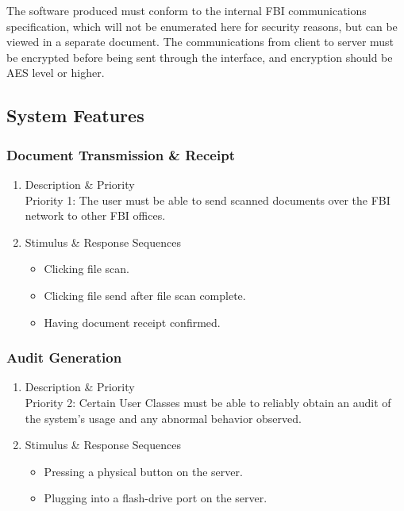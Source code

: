 \documentclass[12pt]{article}
\begin{document}
The software produced must conform to the internal FBI communications specification, which will not be
enumerated here for security reasons, but can be viewed in a separate document. The communications from client
to server must be encrypted before being sent through the interface, and encryption should be AES level or higher.

\subsection{System Features}

\subsubsection{Document Transmission \& Receipt}

\begin{enumerate}
    \item Description \& Priority\\
    Priority 1: The user must be able to send scanned documents over the FBI network to other FBI offices.
    \item Stimulus \& Response Sequences
    \begin{itemize}
        \item Clicking file scan.
        \item Clicking file send after file scan complete.
        \item Having document receipt confirmed.
    \end{itemize}
\end{enumerate}

\subsubsection{Audit Generation}

\begin{enumerate}
    \item Description \& Priority\\
    Priority 2: Certain User Classes must be able to reliably obtain an audit of the system's usage and any
    abnormal behavior observed.
    \item Stimulus \& Response Sequences
    \begin{itemize}
        \item Pressing a physical button on the server.
        \item Plugging into a flash-drive port on the server.
    \end{itemize}
\end{enumerate}
\end{document}

